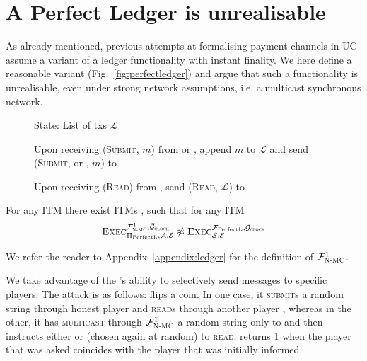 \section{A Perfect Ledger is unrealisable}
\label{appendix:perfectledger}
  As already mentioned, previous attempts at formalising payment channels in
  UC~\cite{DBLP:conf/ccs/DziembowskiFH18,perun,Malavolta:2017:CPP:3133956.3134096,sprites}
  assume a variant of a ledger functionality with instant finality. We here
  define a reasonable variant \perfectledger{} (Fig.~\ref{fig:perfectledger})
  and argue that such a functionality is unrealisable, even under strong network
  assumptions, i.e. a multicast synchronous network.

  \begin{figure}[H]
    \begin{systembox}{\perfectledger}
      \begin{algorithmic}[1]
        \State State: List of txs $\mathcal{L}$
        \Statex

        \State Upon receiving (\textsc{Submit}, $m$) from \alice or \adversary,
        append $m$ to $\mathcal{L}$ and send (\textsc{Submit}, \alice or
        \adversary, $m$) to \adversary
        \Statex

        \State Upon receiving (\textsc{Read}) from \alice, send (\textsc{Read},
        $\mathcal{L}$) to \alice
      \end{algorithmic}
    \end{systembox}
    \caption{}
    \label{fig:perfectledger:func}
  \end{figure}

  \begin{theorem}
    \label{theorem:perfectledger}
    For any ITM \perfectprot{} there exist ITMs \perfectenv,
    \perfectadv{} such that for any ITM \simulator
    \begin{equation*}
      \textsc{Exec}^{\mathcal{F}_{\textsc{N-MC}}^1, \bar{\mathcal{G}}_{\textsc{clock}}}_{\Pi_{\mathrm{PerfectL}}, \mathcal{A},
      \mathcal{E}} \not\approx \textsc{Exec}^{\mathcal{F}_{\mathrm{PerfectL}},
      \bar{\mathcal{G}}_{\textsc{clock}}}_{\mathcal{S}, \mathcal{E}}
    \end{equation*}
  \end{theorem}

  We refer the reader to Appendix~\ref{appendix:ledger} for the definition of
  $\mathcal{F}_{\textsc{N-MC}}^1$.

  \begin{proofsketch}
    We take advantage of the \adversary's ability to selectively send messages
    to specific players. The attack is as follows: \environment{} flips a coin.
    In one case, it \textsc{submit}s a random string through honest player
    \alice{} and \textsc{read}s through another player \bob,
    whereas in the other, it has \adversary{} \textsc{multicast} through
    $\mathcal{F}_{\textsc{N-MC}}^1$ a random string only to \alice and then instructs either
    \alice{} or \bob{} (chosen again at random) to \textsc{read}. \environment{}
    returns 1 when the player that was asked coincides with the player that was
    initially informed 
  \end{proofsketch}

